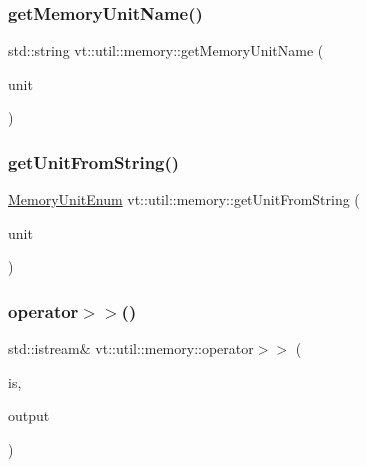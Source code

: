 \subsubsection{\texorpdfstring{get\+Memory\+Unit\+Name()}{getMemoryUnitName()}}
{\footnotesize\ttfamily std\+::string vt\+::util\+::memory\+::get\+Memory\+Unit\+Name (\begin{DoxyParamCaption}\item[{\hyperlink{namespacevt_1_1util_1_1memory_a64df3d84293b34009f78e2a1db2f9bb6}{Memory\+Unit\+Enum}}]{unit }\end{DoxyParamCaption})}

\mbox{\label{namespacevt_1_1util_1_1memory_aeceb7d7ac924dd3d88a58eab5ebf64f7}} 
\subsubsection{\texorpdfstring{get\+Unit\+From\+String()}{getUnitFromString()}}
{\footnotesize\ttfamily \hyperlink{namespacevt_1_1util_1_1memory_a64df3d84293b34009f78e2a1db2f9bb6}{Memory\+Unit\+Enum} vt\+::util\+::memory\+::get\+Unit\+From\+String (\begin{DoxyParamCaption}\item[{std\+::string const \&}]{unit }\end{DoxyParamCaption})}

\mbox{\label{namespacevt_1_1util_1_1memory_afe1acbbca9aa1bd7310548cefd40045c}} 
\subsubsection{\texorpdfstring{operator$>$$>$()}{operator>>()}}
{\footnotesize\ttfamily std\+::istream\& vt\+::util\+::memory\+::operator$>$$>$ (\begin{DoxyParamCaption}\item[{std\+::istream \&}]{is,  }\item[{\hyperlink{structvt_1_1util_1_1memory_1_1_comma_delimit}{Comma\+Delimit} \&}]{output }\end{DoxyParamCaption})}



